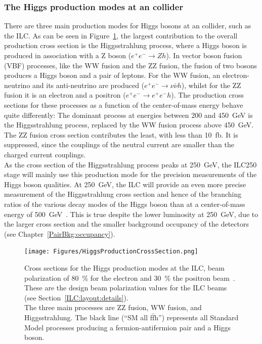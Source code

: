 \subsubsection{\texorpdfstring{The Higgs production modes at an \positron\electron collider}{The Higgs production modes at an electron positron collider}}
There are three main production modes for Higgs bosons at an \positron\electron collider, such as the ILC.
As can be seen in Figure~\ref{fig:HiggsProduction}, the largest contribution to the overall production cross section is the Higgsstrahlung process, where a Higgs boson is produced in association with a Z boson ($e^+e^-\rightarrow Zh$).
In vector boson fusion (VBF) processes, like the WW fusion and the ZZ fusion, the fusion of two bosons produces a Higgs boson and a pair of leptons.
For the WW fusion, an electron-neutrino and its anti-neutrino are produced ($e^+e^-\rightarrow \nu\bar{\nu} h$), whilst for the ZZ fusion it is an electron and a positron ($e^+e^-\rightarrow e^+e^-h$).
The production cross sections for these processes as a function of the center-of-mass energy behave quite differently:
The dominant process at energies between 200 and \SI{450}{\GeV} is the Higgsstrahlung process, replaced by the WW fusion process above \SI{450}{\GeV}.
The ZZ fusion cross section contributes the least, with less than \SI{10}{fb}.
It is suppressed, since the couplings of the neutral current are smaller than the charged current couplings.\\
As the cross section of the Higgsstrahlung process peaks at \SI{250}{\GeV}, the ILC250 stage will mainly use this production mode for the precision measurements of the Higgs boson qualities.
At \SI{250}{\GeV}, the ILC will provide an even more precise measurement of the Higgsstrahlung cross section and hence of the branching ratios of the various decay modes of the Higgs boson than at a center-of-mass energy of \SI{500}{\GeV}~\cite[p. 14]{PhysicsCase}.
This is true despite the lower luminosity at \SI{250}{\GeV}, due to the larger cross section and the smaller background occupancy of the detectors (see Chapter~\ref{PairBkg:occupancy}).
\begin{figure}
\centering
\texttt{[image: Figures/HiggsProductionCrossSection.png]}
\caption[Cross section for the Higgs production modes at ILC]{Cross sections for the Higgs production modes at the ILC, beam polarization of \SI[detect-all]{80}{\percent} for the electron and \SI[detect-all]{30}{\percent} the positron beam~\cite[p. 13]{PhysicsCase}.
These are the design beam polarization values for the ILC beams (see Section~\ref{ILC:layout:details}).
\\The three main processes are ZZ fusion, WW fusion, and Higgsstrahlung.
The black line (``SM all f$\bar{\mathrm{f}}$h'') represents all Standard Model processes producing a fermion-antifermion pair and a Higgs boson.  
}
\label{fig:HiggsProduction}
\end{figure}


